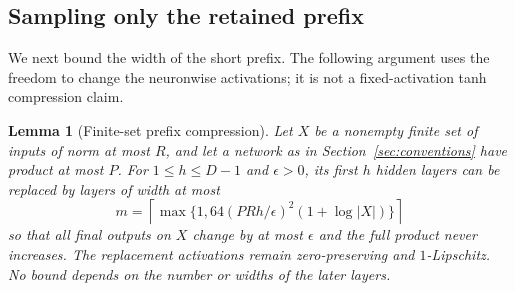 \documentclass[11pt]{article}
\newtheorem{lemma}[theorem]{Lemma}
\theoremstyle{remark}
\begin{document}
\subsection{Sampling only the retained prefix}

We next bound the width of the short prefix. The following argument
uses the freedom to change the neuronwise activations; it is not a
fixed-activation tanh compression claim.

\begin{lemma}[Finite-set prefix compression]
\label{lem:maurey}
Let $X$ be a nonempty finite set of inputs of norm at most $R$, and let a network
as in Section~\ref{sec:conventions} have product at most $P$.
For $1\le h\le D-1$ and $\epsilon>0$, its first $h$ hidden layers can
be replaced by layers of width at most
\[
 m=\left\lceil
 \max\{1,64(PRh/\epsilon)^2(1+\log|X|)\}
 \right\rceil
\]
so that all final outputs on $X$ change by at most $\epsilon$ and the
full product never increases. The replacement activations remain
zero-preserving and $1$-Lipschitz. No bound depends on the number or
widths of the later layers.
\end{lemma}
\end{document}
